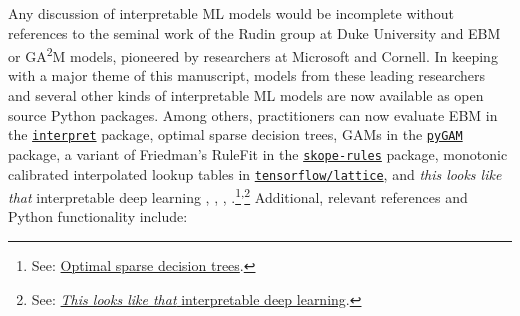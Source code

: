 \documentclass[information,article,submit,moreauthors,pdftex]{definitions/mdpi}
\begin{document}
Any discussion of interpretable ML models would be incomplete without references to the seminal work of the Rudin group at Duke University and EBM or GA\textsuperscript{2}M models, pioneered by researchers at Microsoft and Cornell. In keeping with a major theme of this manuscript, models from these leading researchers and several other kinds of interpretable ML models are now available as open source Python packages. Among others, practitioners can now evaluate EBM in the \href{https://github.com/interpretml/interpret}{\texttt{interpret}} package, optimal sparse decision trees, GAMs in the \href{https://github.com/dswah/pyGAM}{\texttt{pyGAM}} package, a variant of Friedman's RuleFit  in the \href{https://github.com/scikit-learn-contrib/skope-rules}{\texttt{skope-rules}} package, monotonic calibrated interpolated lookup tables in \href{https://github.com/tensorflow/lattice}{\texttt{tensorflow/lattice}}, and \textit{this looks like that} interpretable deep learning \cite{osdt}, \cite{rulefit}, \cite{lattice}, \cite{this_looks_like_that}.\footnote{See: \href{https://github.com/xiyanghu/OSDT}{Optimal sparse decision trees}.}\textsuperscript{,}\footnote{See: \href{https://github.com/cfchen-duke/ProtoPNet}{\textit{This looks like that} interpretable deep learning}.} Additional, relevant references and Python functionality include:
\end{document}
